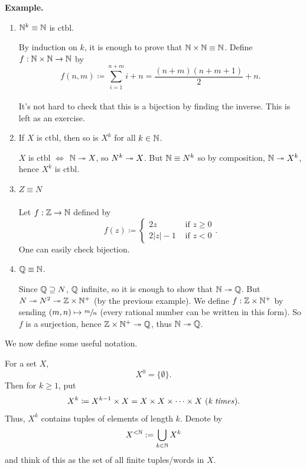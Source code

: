 \documentclass[14pt,oneside]{extarticle}
\newenvironment{example}{
    \par
    \vspace{5pt}
    \noindent\textbf{Example.}
    \begin{tcolorbox}[
        blanker, breakable, left=5mm, parbox=false,
        before upper={\parindent15pt},
        after skip=10pt,
        borderline west={1mm}{0pt}{solarized-magenta!50}]
}{
    \end{tcolorbox}
    \vspace{5pt}
}
\begin{document}
\begin{example}
  \begin{enumerate}[label=$\circ$, leftmargin=*, itemsep=1em]
    \item $\mathbb{N}^k \equiv \mathbb{N}$ is ctbl.

    \noindent\soln By induction on $k$, it is enough to prove that $\mathbb{N} \times \mathbb{N} \equiv \mathbb{N}$. Define $f: \mathbb{N} \times \mathbb{N} \to \mathbb{N}$ by \[f(n,m) \coloneqq \sum_{i=1}^{n+m}i + n = \frac{(n+m)(n+m+1)}{2} + n.\]
    \pic \\
    It's not hard to check that this is a bijection by finding the inverse. This is left as an exercise.

    \item If $X$ is ctbl, then so is $X^k$ for all $k \in \mathbb{N}$.
    
    \noindent \soln $X$ is ctbl $\iff$ $\mathbb{N} \twoheadrightarrow{} X$, so $N^k \twoheadrightarrow{} X$. But $\mathbb{N} \equiv N^k$ so by composition, $\mathbb{N} \twoheadrightarrow{} X^k$, hence $X^k$ is ctbl.

    \item $Z \equiv N$ \\
    \pic \\
    \noindent \soln Let $f: \mathbb{Z} \to \mathbb{N}$ defined by
    \[f(z) \coloneqq \begin{cases}
      2z & \text{ if } z \geq 0 \\
      2|z|-1 & \text{ if } z < 0
    \end{cases}.\]
    One can easily check bijection.

    \item $\mathbb{Q} \equiv \mathbb{N}$.
    
    \noindent \soln Since $\mathbb{Q} \supseteq N$, $\mathbb{Q}$ infinite, so it is enough to show that $\mathbb{N} \twoheadrightarrow{} \mathbb{Q}$. But $N \twoheadrightarrow{} N^2 \twoheadrightarrow{} \mathbb{Z} \times \mathbb{N}^+$ (by the previous example). We define $f: \mathbb{Z} \times \mathbb{N}^+$ by sending $(m,n) \mapsto \sfrac m n$ (every rational number can be written in this form). So $f$ is a surjection, hence $\mathbb{Z} \times \mathbb{N}^+ \twoheadrightarrow{} \mathbb{Q}$, thus $\mathbb{N} \twoheadrightarrow{} \mathbb{Q}$.
  \end{enumerate}
\end{example}

We now define some useful notation. 

\begin{notation*}
  For a set $X$, \[X^0 = \{\emptyset\}.\] Then for $k \geq 1$, put \[X^k \coloneqq X^{k-1}\times X = X \times X \times \cdots \times X \text{ (\textit{k times})}.\] Thus, $X^k$ contains tuples of elements of length $k$. Denote by \[X^{<\mathbb{N}} := \bigcup_{k \in \mathbb{N}}X^k\] and think of this as the set of all finite tuples/words in $X$.
\end{notation*}
\end{document}
